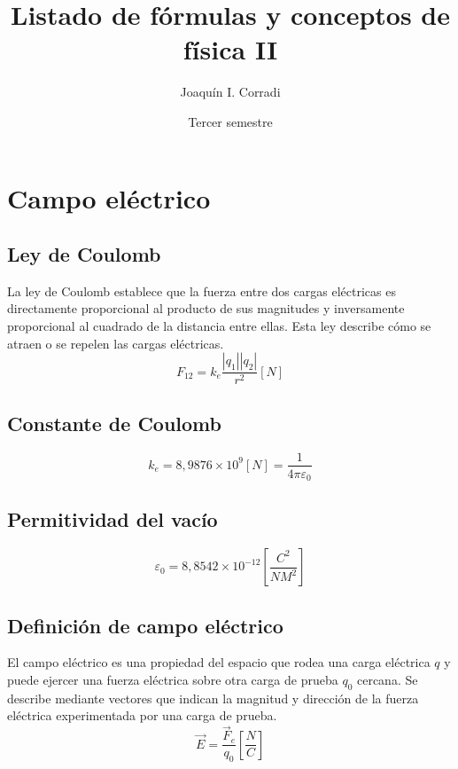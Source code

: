 \documentclass{report}
\title{Listado de fórmulas y conceptos de física II}
\date{Tercer semestre}
\author{Joaquín I. Corradi}
\begin{document}
  \maketitle
  \setcounter{tocdepth}{5}
  \tableofcontents
  \newpage

  \section*{Campo eléctrico}

    \subsection*{Ley de Coulomb}
      La ley de Coulomb establece que la fuerza entre dos cargas eléctricas es directamente 
      proporcional al producto de sus magnitudes y inversamente proporcional al cuadrado de 
      la distancia entre ellas. Esta ley describe cómo se atraen o se repelen las cargas eléctricas.
      \begin{equation*}
        F_{12}=k_e\frac{|q_1||q_2|}{r^2}[N]
      \end{equation*}

    \subsection*{Constante de Coulomb}
      \begin{equation*}
        k_e=8,9876\times10^9[N]=\frac{1}{4\pi\varepsilon_0}
      \end{equation*}

    \subsection*{Permitividad del vacío}
      \begin{equation*}
        \varepsilon_0=8,8542\times10^{-12}\left[\frac{C^2}{NM^2}\right]
      \end{equation*}

    \subsection*{Definición de campo eléctrico}
      El campo eléctrico es una propiedad del espacio que rodea una carga eléctrica $q$ y puede ejercer una 
      fuerza eléctrica sobre otra carga de prueba $q_0$ cercana. Se describe mediante vectores que indican la 
      magnitud y dirección de la fuerza eléctrica experimentada por una carga de prueba.
      \begin{equation*}
        \vec{E}=\frac{\vec{F}_e}{q_0}\left[\frac{N}{C}\right]
      \end{equation*}
\end{document}
